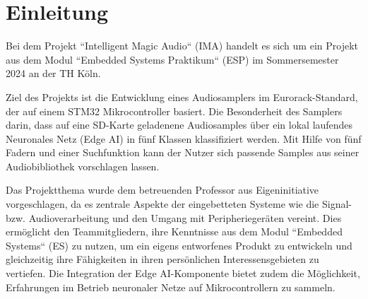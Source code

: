 \newpage
\section{Einleitung}

Bei dem Projekt ``Intelligent Magic Audio`` (IMA) handelt es sich um ein Projekt aus dem Modul ``Embedded Systems Praktikum`` (ESP) im Sommersemester 2024 an der TH Köln.

Ziel des Projekts ist die Entwicklung eines Audiosamplers im Eurorack-Standard, der auf einem STM32 Mikrocontroller basiert. Die Besonderheit des Samplers darin, dass auf eine SD-Karte geladenene Audiosamples über ein lokal laufendes Neuronales Netz (Edge AI) in fünf Klassen klassifiziert werden. Mit Hilfe von fünf Fadern und einer Suchfunktion kann der Nutzer sich passende Samples aus seiner Audiobibliothek vorschlagen lassen. 

Das Projektthema wurde dem betreuenden Professor aus Eigeninitiative vorgeschlagen, da es zentrale Aspekte der eingebetteten Systeme wie die Signal- bzw. Audioverarbeitung und den Umgang mit Peripheriegeräten vereint. Dies ermöglicht den Teammitgliedern, ihre Kenntnisse aus dem Modul ``Embedded Systems`` (ES) zu nutzen, um ein eigens entworfenes Produkt zu entwickeln und gleichzeitig ihre Fähigkeiten in ihren persönlichen Interessensgebieten zu vertiefen. Die Integration der Edge AI-Komponente bietet zudem die Möglichkeit, Erfahrungen im Betrieb neuronaler Netze auf Mikrocontrollern zu sammeln.

